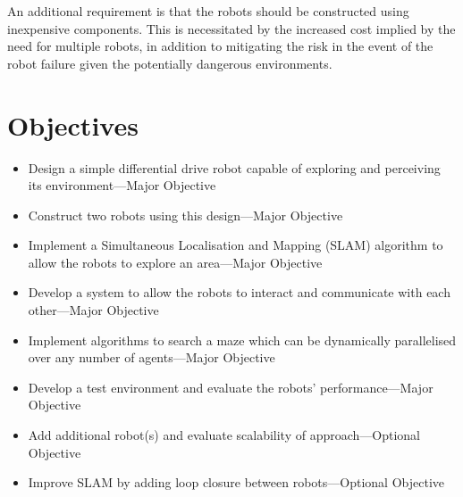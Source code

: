 An additional requirement is that the robots should be constructed using
inexpensive components. This is necessitated by the increased cost implied
by the need for multiple robots, in addition to mitigating the risk in the 
event of the robot failure given the potentially dangerous environments.

\section{Objectives}\label{introduction/objectives}
\begin{itemize}
\item{Design a simple differential drive robot capable of exploring and perceiving its environment---Major Objective}
    \item{Construct two robots using this design---Major Objective}
    \item{Implement a Simultaneous Localisation and Mapping (SLAM) algorithm to allow the robots to explore an area---Major Objective}
    \item{Develop a system to allow the robots to interact and communicate with each other---Major Objective}
    \item{Implement algorithms to search a maze which can be dynamically parallelised over any number of agents---Major Objective}
    \item{Develop a test environment and evaluate the robots’ performance---Major Objective}
    \item{Add additional robot(s) and evaluate scalability of approach---Optional Objective}
    \item{Improve SLAM by adding loop closure between robots---Optional Objective}
\end{itemize}
